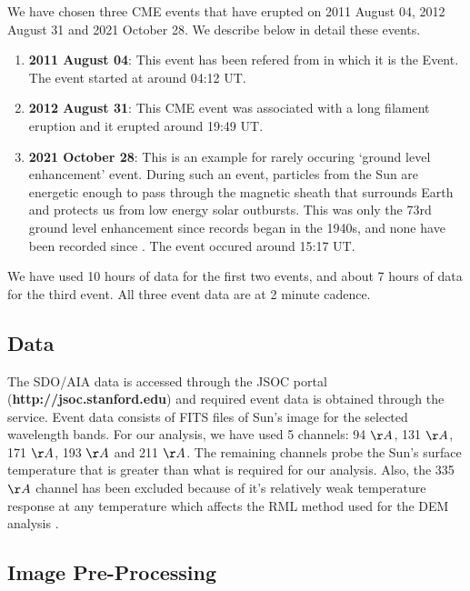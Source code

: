We have chosen three CME events that have erupted on 2011 August 04, 2012 August 31 and 2021 October 28. We describe below in detail these events.

\begin{enumerate}

        \item\textbf{2011 August 04}: This event has been refered from \citep{Mason2016} in which it is the  Event. The event started at around 04:12 UT.

        \item\textbf{2012 August 31}: This CME event was associated with a long filament eruption and it erupted around 19:49 UT.

        \item\textbf{2021 October 28}: This is an example for rarely occuring `ground level enhancement' event. During such an event, particles from the Sun are energetic enough to pass through the magnetic sheath that surrounds Earth and protects us from low energy solar outbursts. This was only the 73rd ground level enhancement since records began in the 1940s, and none have been recorded since \citep{Klein2022}. The event occured around 15:17 UT.\\

\end{enumerate}

\noindent We have used 10 hours of data for the first two events, and about 7 hours of data for the third event. All three event data are at 2 minute cadence.

\subsection{Data}

The SDO/AIA data is accessed through the JSOC portal (\textbf{http://jsoc.stanford.edu}) and required event data is obtained through the service. Event data consists of FITS files of Sun's image for the selected wavelength bands. For our analysis, we have used 5 channels: 94 $\AA$, 131 $\AA$, 171 $\AA$, 193 $\AA$ and 211 $\AA$. The remaining channels probe the Sun's surface temperature that is greater than what is required for our analysis. Also, the 335 $\AA$ channel has been excluded because of it's relatively weak temperature response at any temperature which affects the RML method used for the DEM analysis \citep{Massa2023}.

\subsection{Image Pre-Processing}


